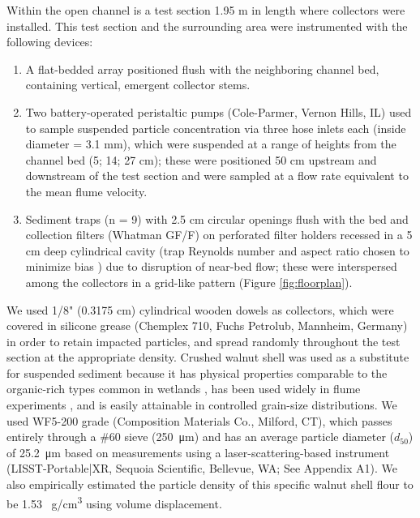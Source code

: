 \documentclass[geosciences,article,submit,moreauthors,pdftex]{Definitions/mdpi}
\begin{document}
Within the open channel is a test section 1.95 m in length where collectors were installed. This test section and the surrounding area were instrumented with the following devices:
\begin{enumerate}
     \item A flat-bedded array positioned flush with the neighboring channel bed, containing vertical, emergent collector stems.
    \item Two battery-operated peristaltic pumps (Cole-Parmer, Vernon Hills, IL) used to sample suspended particle concentration via three hose inlets each (inside diameter = 3.1 mm), which were suspended at a range of heights from the channel bed (5; 14; 27 cm); these were positioned 50 cm upstream and downstream of the test section and were sampled at a flow rate equivalent to the mean flume velocity.
   \item Sediment traps (n = 9) with 2.5 cm circular openings flush with the bed and collection filters (Whatman GF/F) on perforated filter holders recessed in a 5 cm deep cylindrical cavity (trap Reynolds number and aspect ratio chosen to minimize bias \cite{butman1986sediment}) due to disruption of near-bed flow; these were interspersed among the collectors in a grid-like pattern (Figure \ref{fig:floorplan}).
\end{enumerate}

We used 1/8" (0.3175 cm) cylindrical wooden dowels as collectors, which were covered in silicone grease (Chemplex 710, Fuchs Petrolub, Mannheim, Germany) in order to retain impacted particles, and spread randomly throughout the test section at the appropriate density. Crushed walnut shell was used as a substitute for suspended sediment because it has physical properties comparable to the organic-rich types common in wetlands \cite{muller2017experiments, jenzer2015sediment, redding2006particle}, has been used widely in flume experiments \cite{baar2018sediment,fisher1983organic,tlili2013effect}, and is easily attainable in controlled grain-size distributions. We used WF5-200 grade (Composition Materials Co., Milford, CT), which passes entirely through a \#60 sieve (\SI{250}{\micro\metre}) and has an average particle diameter ($d_{50}$) of \SI{25.2}{\micro\metre} based on measurements using a laser-scattering-based instrument (LISST-Portable|XR, Sequoia Scientific, Bellevue, WA; See Appendix A1). We also empirically estimated the particle density of this specific walnut shell flour to be 1.53 \SI{}{\gram/\centi\metre\cubed} using volume displacement.
\end{document}
